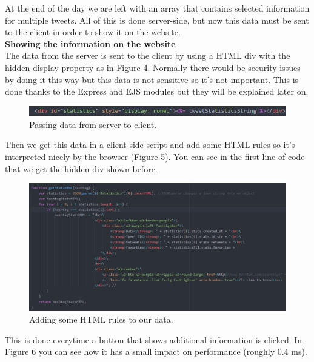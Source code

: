 \documentclass[12pt]{article} %
\begin{document}
\noindent At the end of the day we are left with an array that contains selected information for multiple tweets.
All of this is done server-side, but now this data must be sent to the client in order to show it on the website.
\\[0.3cm]
\noindent\textbf{Showing the information on the website}
\\[0.3cm]
\noindent The data from the server is sent to the client by using a HTML div with the hidden display property as in Figure 4.
Normally there would be security issues by doing it this way but this data is not sensitive so it's not important.
This is done thanks to the Express and EJS modules but they will be explained later on.

\begin{figure}[H] %
\includegraphics[width=1\linewidth]{images/statisticsDiv}
\caption{Passing data from server to client.}
\label{statisticsDiv}
\end{figure}

\noindent Then we get this data in a client-side script and add some HTML rules so it's interpreted
nicely by the browser (Figure 5). You can see in the first line of code that we get the hidden div shown before.

\begin{figure}[H] %
\includegraphics[width=1\linewidth]{images/interpretingTweetStatistics}
\caption{Adding some HTML rules to our data.}
\label{interpretingTweetStatistics}
\end{figure}

\noindent This is done everytime a button that shows additional information is clicked.
In Figure 6 you can see how it has a small impact on performance (roughly 0.4 ms).
\end{document}
